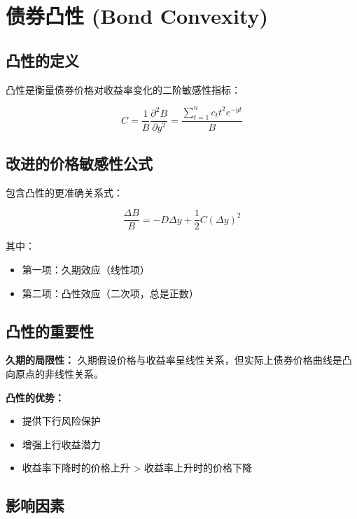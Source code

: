 \section{债券凸性 (Bond Convexity)}

\subsection{凸性的定义}

凸性是衡量债券价格对收益率变化的二阶敏感性指标：

\begin{equation}
C = \frac{1}{B} \frac{\partial^2 B}{\partial y^2} = \frac{\sum_{t=1}^{n} c_t t^2 e^{-yt}}{B}
\end{equation}

\subsection{改进的价格敏感性公式}

包含凸性的更准确关系式：

\begin{equation}
\frac{\Delta B}{B} = -D\Delta y + \frac{1}{2}C(\Delta y)^2
\end{equation}

\noindent 其中：
\begin{itemize}
    \item 第一项：久期效应（线性项）
    \item 第二项：凸性效应（二次项，总是正数）
\end{itemize}

\subsection{凸性的重要性}

\textbf{久期的局限性：}
久期假设价格与收益率呈线性关系，但实际上债券价格曲线是凸向原点的非线性关系。

\textbf{凸性的优势：}
\begin{itemize}
    \item 提供下行风险保护
    \item 增强上行收益潜力
    \item 收益率下降时的价格上升 > 收益率上升时的价格下降
\end{itemize}

\subsection{影响因素}

